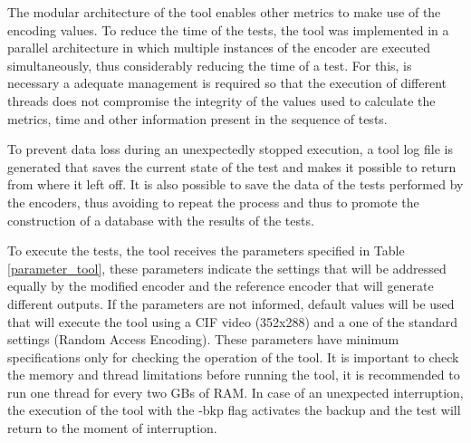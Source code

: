 \documentclass[journal]{IEEEtran}
\begin{document}
The modular architecture of the tool enables other metrics to make use of the encoding values. To reduce the time of the tests, the tool was implemented in a parallel architecture in which multiple instances of the encoder are executed simultaneously, thus considerably reducing the time of a test. For this, is necessary a adequate management is required so that the execution of different threads does not compromise the integrity of the values used to calculate the metrics, time and other information present in the sequence of tests.

To prevent data loss during an unexpectedly stopped execution, a tool log file is generated that saves the current state of the test and makes it possible to return from where it left off. It is also possible to save the data of the tests performed by the encoders, thus avoiding to repeat the process and thus to promote the construction of a database with the results of the tests.

To execute the tests, the tool receives the parameters specified in Table \ref{parameter_tool}, these parameters indicate the settings that will be addressed equally by the modified encoder and the reference encoder that will generate different outputs. If the parameters are not informed, default values will be used that will execute the tool using a CIF video (352x288) and a one of the standard settings (Random Access Encoding). These parameters have minimum specifications only for checking the operation of the tool. It is important to check the memory and thread limitations before running the tool, it is recommended to run one thread for every two GBs of RAM. In case of an unexpected interruption, the execution of the tool with the -bkp flag activates the backup and the test will return to the moment of interruption.

\FloatBarrier
\end{document}
